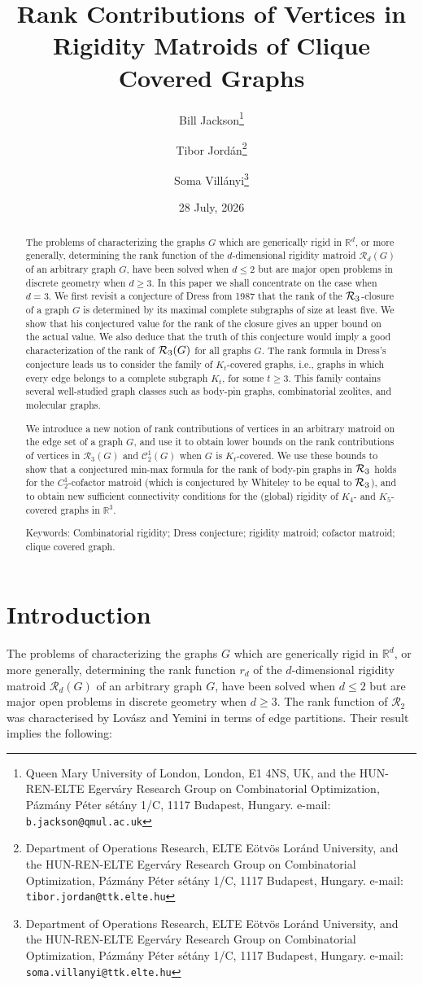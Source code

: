 \documentclass[11pt,a4paper]{article}
\title{\bf Rank Contributions of Vertices in Rigidity Matroids of Clique Covered Graphs}
\author{
Bill Jackson\thanks{Queen Mary University of London, London, E1 4NS, UK, and
the HUN-REN-ELTE Egerv\'ary Research Group
on Combinatorial Optimization, P\'azm\'any P\'eter s\'et\'any 1/C, 1117 Budapest, Hungary.
e-mail: \texttt{b.jackson@qmul.ac.uk}}
\and
Tibor Jord\'an\thanks{Department of Operations Research, ELTE E\"otv\"os Lor\'and University, and the HUN-REN-ELTE Egerv\'ary Research Group
on Combinatorial Optimization, P\'azm\'any P\'eter s\'et\'any 1/C, 1117 Budapest, Hungary.
e-mail: \texttt{tibor.jordan@ttk.elte.hu}}
\and 
Soma Vill\'anyi\thanks{Department of Operations Research, ELTE E\"otv\"os Lor\'and University, and the HUN-REN-ELTE Egerv\'ary Research Group
on Combinatorial Optimization, P\'azm\'any P\'eter s\'et\'any 1/C, 1117 Budapest, Hungary. e-mail: \texttt{soma.villanyi@ttk.elte.hu}}}
\date{28 July, 2026}
\theoremstyle{definition}
\newcommand{\cR}{\mathcal{R}}
\newcommand{\R}{\mathbb{R}}
\newcommand{\cC}{\mathcal{C}}
\begin{document}
\maketitle
\begin{abstract}
The problems of characterizing the graphs $G$ which are generically rigid in $\R^d$, or more generally, determining the rank function of the $d$-dimensional rigidity matroid $\cR_d(G)$ of an arbitrary  graph $G$, have been solved when $d\leq 2$ but  are major open problems in discrete geometry when $d\geq 3$. In this paper we shall concentrate on the case when $d=3$. 
We first revisit a conjecture of Dress from 1987 that the rank of the ${\cal R}_3$-closure of a graph $G$ is determined by its maximal complete subgraphs of size at least five.
We show that his conjectured value for the rank of the closure gives an upper bound on the actual value. We also deduce
that the truth of this conjecture would imply a good characterization of the rank of ${\cal R}_3(G)$ for all graphs $G$. The rank formula in Dress's conjecture leads us to consider 
the 
family of $K_t$-covered graphs, i.e., graphs in which every edge belongs to a complete subgraph $K_t$, for some $t\geq 3$.
This family 
contains several well-studied graph classes such as body-pin graphs, combinatorial zeolites, and molecular graphs.

We introduce a new notion of 
rank contributions of vertices in an arbitrary matroid on the edge set of a graph $G$, and use it to obtain lower bounds on the rank contributions of vertices in $\cR_3(G)$ and $\cC^1_2(G)$ when $G$ is $K_t$-covered. We use these bounds to show that a conjectured min-max formula for the rank of body-pin graphs in ${\cal R}_3$ holds for the $C_2^1$-cofactor matroid  (which is
conjectured by Whiteley to 
be equal to 
${\cal R}_3$), 
and to 
obtain new sufficient connectivity conditions for the (global) rigidity of $K_4$- and $K_5$-covered graphs in $\R^3$.
\smallskip

\noindent Keywords: Combinatorial rigidity; Dress conjecture; rigidity matroid; cofactor matroid; clique covered graph.


\end{abstract}


\section{Introduction}





The problems of characterizing the graphs $G$ which are generically rigid in $\R^d$, or more generally, determining the rank function $r_d$ of the $d$-dimensional rigidity matroid $\cR_d(G)$ of an arbitrary  graph $G$, have been solved when $d\leq 2$ but  are major open problems in discrete geometry when $d\geq 3$. 
The rank function of $\cR_2$ was characterised
by Lov\'asz and Yemini \cite{LY} in terms of edge partitions. Their result implies the following:
\end{document}
